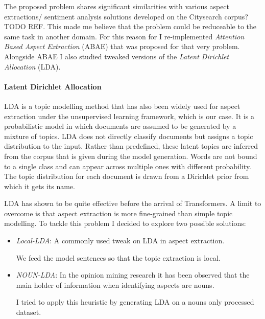 The proposed problem shares significant similarities with various aspect extractions/ sentiment analysis solutions
developed on the Citysearch corpus?TODO REF. This made me believe that the problem could be reduceable to the same task
in another domain.
For this reason for I re-implemented \textit{Attention Based Aspect Extraction}  (ABAE)\cite{he-etal-2017-unsupervised}
that was proposed for that very problem.
Alongside ABAE I also studied tweaked versions of the \textit{Latent Dirichlet Allocation} (LDA).

\paragraph{Latent Dirichlet Allocation}
LDA is a topic modelling method that has also been widely used for aspect extraction under the unsupervised learning framework,
which is our case.
It is a probabilistic model in which documents are assumed to be generated by a mixture of topics.
LDA does not directly classify documents but assigns a topic distribution to the input.
Rather than predefined, these latent topics are inferred from the corpus that is given during the model generation.
Words are not bound to a single class and can appear across multiple ones with different probability.
The topic distribution for each document is drawn from a Dirichlet prior from which it gets its name.

LDA has shown to be quite effective before the arrival of Transformers. A limit to overcome is that aspect extraction
is more fine-grained than simple topic modelling.
To tackle this problem I decided to explore two possible solutions:
\begin{itemize}
    \item{\textit{Local-LDA}}: A commonly used tweak on LDA in aspect extraction.

    We feed the model sentences so that the topic extraction is local.
    \item{\textit{NOUN-LDA}}: In the opinion mining research it has been observed that %
    the main holder of information when identifying aspects are nouns.

    I tried to apply this heuristic by generating LDA on a nouns only processed dataset.
\end{itemize}

